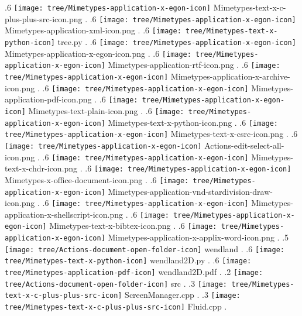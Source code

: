 {.6 { \texttt{[image: tree/Mimetypes-application-x-egon-icon]} Mimetypes-text-x-c-plus-plus-src-icon.png }.
.6 { \texttt{[image: tree/Mimetypes-application-x-egon-icon]} Mimetypes-application-xml-icon.png }.
.6 { \texttt{[image: tree/Mimetypes-text-x-python-icon]} tree.py }.
.6 { \texttt{[image: tree/Mimetypes-application-x-egon-icon]} Mimetypes-application-x-egon-icon.png }.
.6 { \texttt{[image: tree/Mimetypes-application-x-egon-icon]} Mimetypes-application-rtf-icon.png }.
.6 { \texttt{[image: tree/Mimetypes-application-x-egon-icon]} Mimetypes-application-x-archive-icon.png }.
.6 { \texttt{[image: tree/Mimetypes-application-x-egon-icon]} Mimetypes-application-pdf-icon.png }.
.6 { \texttt{[image: tree/Mimetypes-application-x-egon-icon]} Mimetypes-text-plain-icon.png }.
.6 { \texttt{[image: tree/Mimetypes-application-x-egon-icon]} Mimetypes-text-x-python-icon.png }.
.6 { \texttt{[image: tree/Mimetypes-application-x-egon-icon]} Mimetypes-text-x-csrc-icon.png }.
.6 { \texttt{[image: tree/Mimetypes-application-x-egon-icon]} Actions-edit-select-all-icon.png }.
.6 { \texttt{[image: tree/Mimetypes-application-x-egon-icon]} Mimetypes-text-x-chdr-icon.png }.
.6 { \texttt{[image: tree/Mimetypes-application-x-egon-icon]} Mimetypes-x-office-document-icon.png }.
.6 { \texttt{[image: tree/Mimetypes-application-x-egon-icon]} Mimetypes-application-vnd-stardivision-draw-icon.png }.
.6 { \texttt{[image: tree/Mimetypes-application-x-egon-icon]} Mimetypes-application-x-shellscript-icon.png }.
.6 { \texttt{[image: tree/Mimetypes-application-x-egon-icon]} Mimetypes-text-x-bibtex-icon.png }.
.6 { \texttt{[image: tree/Mimetypes-application-x-egon-icon]} Mimetypes-application-x-applix-word-icon.png }.
.5 { \texttt{[image: tree/Actions-document-open-folder-icon]} wendland }.
.6 { \texttt{[image: tree/Mimetypes-text-x-python-icon]} wendland2D.py }.
.6 { \texttt{[image: tree/Mimetypes-application-pdf-icon]} wendland2D.pdf }.
.2 { \texttt{[image: tree/Actions-document-open-folder-icon]} src }.
.3 { \texttt{[image: tree/Mimetypes-text-x-c-plus-plus-src-icon]} ScreenManager.cpp }.
.3 { \texttt{[image: tree/Mimetypes-text-x-c-plus-plus-src-icon]} Fluid.cpp }.
}
